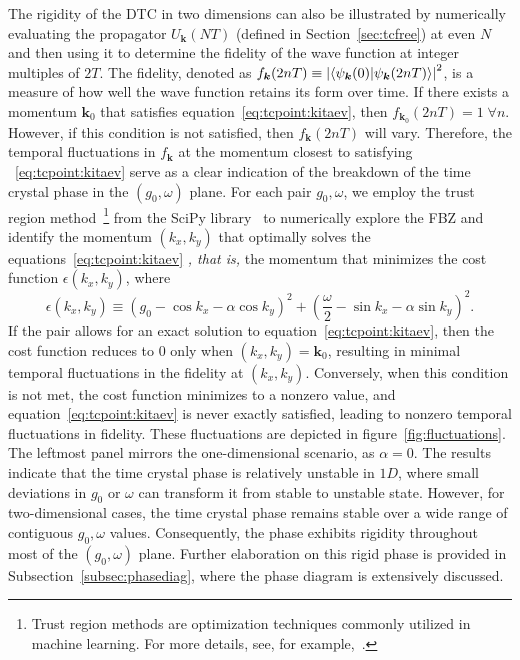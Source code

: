 \documentclass[preprint,5p,times,twocolumn]{elsarticle}
\newcommand{\bmk}{\bm{k}}
\begin{document}
The rigidity of the DTC in two dimensions can also be illustrated by numerically evaluating the propagator $U^{\;}_{\bmk}(NT)$ (defined in Section~\ref{sec:tcfree}) at even $N$ and then using it to determine the fidelity of the wave function at integer multiples of $2T$. The fidelity, denoted as $f_{\bmk}(2nT) \equiv \abs{\ip{\psi_{\bmk}(0)}{\psi_{\bmk}(2nT)}}^2$, is a measure of how well the wave function retains its form over time. If there exists a momentum $\bmk_0$ that satisfies equation~\ref{eq:tcpoint:kitaev}, then $f_{\bmk_0}(2nT)=1\;\forall n$. However, if this condition is not satisfied, then $f_{\bmk}(2nT)$ will vary. Therefore, the temporal fluctuations in $f_{\bmk}$ at the momentum closest to satisfying ~\ref{eq:tcpoint:kitaev} serve as a clear indication of the breakdown of the time crystal phase in the $(g_0,\omega)$ plane. For each pair $g_0,\omega$, we employ the trust region method~\footnote{Trust region methods are optimization techniques commonly utilized in machine learning. For more details, see, for example,~\citep{Conn2000}.} from the SciPy library~\citep{2020SciPy-NMeth} to numerically explore the FBZ and identify the momentum $(k_x, k_y)$ that optimally solves the equations~\ref{eq:tcpoint:kitaev} \textit{, that is,} the momentum that minimizes the cost function $\epsilon(k_x, k_y)$, where 
\begin{equation} 
\epsilon(k_x, k_y) \equiv \left(g_0-\cos{k_x} - \alpha\cos{k_y}\right)^2 + \left(\frac{\omega}{2}-\sin{k_x} - \alpha\sin{k_y}\right)^2. 
\label{eq:cost:fn} 
\end{equation} 
If the pair allows for an exact solution to equation~\ref{eq:tcpoint:kitaev}, then the cost function reduces to $0$ only when $(k_x, k_y)=\bmk_0$, resulting in minimal temporal fluctuations in the fidelity at $(k_x, k_y)$. Conversely, when this condition is not met, the cost function minimizes to a nonzero value, and equation~\ref{eq:tcpoint:kitaev} is never exactly satisfied, leading to nonzero temporal fluctuations in fidelity. These fluctuations are depicted in figure~\ref{fig:fluctuations}. The leftmost panel mirrors the one-dimensional scenario, as $\alpha=0$. The results indicate that the time crystal phase is relatively unstable in $1D$, where small deviations in $g_0$ or $\omega$ can transform it from stable to unstable state. However, for two-dimensional cases, the time crystal phase remains stable over a wide range of contiguous $g_0, \omega$ values. Consequently, the phase exhibits rigidity throughout most of the $(g_0, \omega)$ plane. Further elaboration on this rigid phase is provided in Subsection~\ref{subsec:phasediag}, where the phase diagram is extensively discussed.
\end{document}
